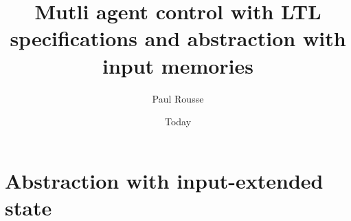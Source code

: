 \documentclass[electronic]{kthesis}
\newcommand{\vect}[1]{\ensuremath{ \mathbf{#1}}}
\theoremstyle{named}
\begin{document}
\title{Mutli agent control with LTL specifications and abstraction with input memories}
\subtitle{}
\author{Paul Rousse}
\date{Today}
\imprint{}
\disputationsdatum{}
\disputationslokal{}
\publisher{}
\examen{}

\frontmatter

\maketitle

\tableofcontents

\mainmatter 



\newcommand{\SSunobs}{\mathfrak{X}^i}
\newcommand{\SSobs}{\mathfrak{X}^o}
\newcommand{\Ninputs}{\Delta n_u}%
\newcommand{\y}{\vect{y}}%
\newcommand{\x}{\vect{x}}%
\newcommand{\xa}{\vect{x}^a}%
\newcommand{\xobs}{\vect{x}^o}%
\newcommand{\Xobs}{X^o}%
\newcommand{\Xobsinit}{X^o_0}%
\newcommand{\xunobs}{\vect{x}^i}%
\newcommand{\Xunobs}{X^i}%
\newcommand{\Sunobs}{\mathcal{S}^i}%
\newcommand{\Xuinv}{{\mathcal{X}^i}}%
\newcommand{\pastuseq}{\vect{u}_{n-\Ninputs},\dots,\vect{u}_{n-1}}%
\newcommand{\pastuseqn}{\vect{u}_{n+1-\Ninputs},\dots,\vect{u}_{n}}%
\newcommand{\Pastuseq}{U_n}%
\newcommand{\sys}{\mathcal{S}}%
\newcommand{\sysa}{\mathcal{S}_a}%
\newcommand{\sysaU}{\mathcal{U}}%
\newcommand{\sysA}{\mathcal{S}_A}%
\newcommand{\sysB}{\mathcal{S}_B}%
\newcommand{\Usys}{\mathcal{U}}%
\newcommand{\Wsys}{\mathcal{W}}%
\newcommand{\Uunobs}{{\mathcal{U}^i}}%
\newcommand{\Wunobs}{{\mathcal{W}^i}}%
\newcommand{\uobs}{\vect{u}^o}%
\newcommand{\wobs}{\vect{w}^o}%
\newcommand{\uunobs}{\vect{u}^i}%
\newcommand{\wunobs}{\vect{w}^i}%
\newcommand{\Dunobs}{n^i}%
\newcommand{\R}{\mathbb{R}}%
\newcommand{\mle}{\prec}
\newcommand{\mleq}{\preceq}
\newcommand{\minf}[1]{\underline{#1}}
\newcommand{\msup}[1]{\overline{#1}}
\newcommand{\X}{X}%
\newcommand{\Xinv}{\mathcal{X}}%
\newcommand{\U}{\mathcal{U}}%
\newcommand{\W}{\mathcal{W}}%
\newcommand{\vu}{\vect{u}}%
\renewcommand{\u}{\vect{u}}%
\renewcommand{\U}{\mathcal{U}}%
\newcommand{\w}{\vect{w}}%
\newcommand{\s}{\vect{s}}%
\newcommand{\st}{\vect{t}}%
%
\newcommand{\traj}{\varphi}
%
\newcommand{\xd}{\x_d}
\newcommand{\vd}{\vect{v}_d}
\newcommand{\Nobs}{N^o} %
%


\chapter{Abstraction with input-extended state}




%
\end{document}

